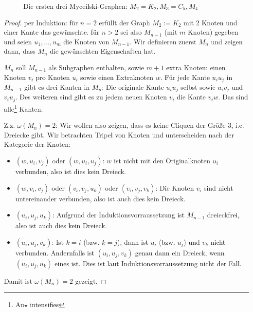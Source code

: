 \documentclass[../main.tex]{subfiles}
\begin{document}
\begin{figure}[h]
    \caption{Die ersten drei Myceilski-Graphen: $M_2 = K_2, M_3 = C_5, M_4$}
\end{figure}
\begin{proof}
    per Induktion: für $n = 2$ erfüllt der Graph $M_2 := K_2$ mit 2 Knoten und einer Kante das gewünschte.
    für $n > 2$ sei also $M_{n-1}$ (mit $m$ Knoten) gegeben und seien $u_1, \hdots, u_m$ die Knoten von $M_{n-1}$. Wir definieren zuerst $M_n$ und zeigen dann, dass $M_n$ die gewünschten Eigenschaften hat.

    $M_n$ soll $M_{n-1}$ als Subgraphen enthalten, sowie $m+1$ extra Knoten: einen Knoten $v_i$ pro Knoten $u_i$ sowie einen Extraknoten $w$. Für jede Kante $u_iu_j$ in $M_{n-1}$ gibt es drei Kanten in $M_n$: Die originale Kante $u_iu_j$ selbst sowie $u_iv_j$ und $v_iu_j$. Des weiteren sind gibt es zu jedem neuen Knoten $v_i$ die Kante $v_iw$. Das sind alle\footnote{Au$\star$ intensifies} Kanten.
    
    Z.z. $\omega(M_n) = 2$: Wir wollen also zeigen, dass es keine Cliquen der Größe 3, i.e. Dreiecke gibt. Wir betrachten Tripel von Knoten und unterscheiden nach der Kategorie der Knoten:
    \begin{itemize}
        \item $(w, u_i, v_j)$ oder $(w, u_i, u_j)$: $w$ ist nicht mit den Originalknoten $u_i$ verbunden, also ist dies kein Dreieck.
        \item $(w, v_i, v_j)$ oder $(v_i, v_j, u_k)$ oder $(v_i, v_j, v_k)$: Die Knoten $v_i$ sind nicht untereinander verbunden, also ist auch dies kein Dreieck.
        \item $(u_i, u_j, u_k)$: Aufgrund der Induktionsvorraussetzung ist $M_{n-1}$ dreieckfrei, also ist auch dies kein Dreieck.
        \item $(u_i, u_j, v_k)$: Ist $k=i$ (bzw. $k=j$), dann ist $u_i$ (bzw. $u_j$) und $v_k$ nicht verbunden. Andernfalls ist $(u_i, u_j, v_k)$ genau dann ein Dreieck, wenn $(u_i, u_j, u_k)$ eines ist. Dies ist laut Induktionsvorraussetzung nicht der Fall.
    \end{itemize}
    Damit ist $\omega(M_n) = 2$ gezeigt.


\end{proof}
\end{document}
